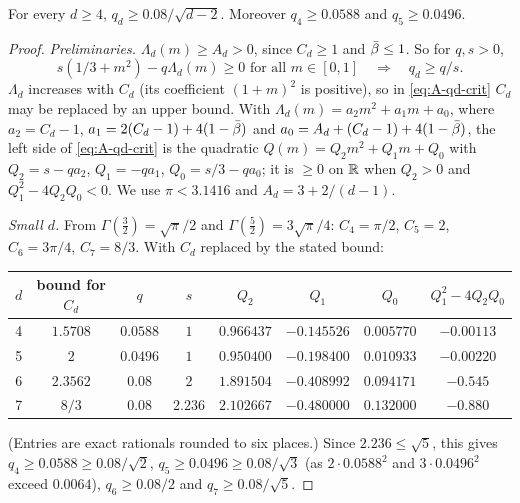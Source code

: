 \begin{proposition}\label{prop:A-qd}
For every $d \ge 4$, $q_d \ge 0.08/\sqrt{d-2}$. Moreover $q_4 \ge 0.0588$ and $q_5 \ge 0.0496$.
\end{proposition}

\begin{proof}
\emph{Preliminaries.} $\Lambda_d(m) \ge A_d > 0$, since $C_d \ge 1$ and $\bar\beta \le 1$. So for $q, s > 0$,
\begin{equation}\label{eq:A-qd-crit}
  s(1/3 + m^2) - q\Lambda_d(m) \ge 0 \text{ for all } m \in [0, 1]
  \quad\Longrightarrow\quad q_d \ge q/s.
\end{equation}
$\Lambda_d$ increases with $C_d$ (its coefficient $(1+m)^2$ is positive), so in
\eqref{eq:A-qd-crit} $C_d$ may be replaced by an upper bound. With
$\Lambda_d(m) = a_2 m^2 + a_1 m + a_0$, where $a_2 = C_d - 1$, $a_1 = 2(C_d - 1) + 4(1 - \bar\beta)$ and
$a_0 = A_d + (C_d - 1) + 4(1 - \bar\beta)$, the left side of \eqref{eq:A-qd-crit} is the quadratic
$Q(m) = Q_2m^2 + Q_1m + Q_0$ with $Q_2 = s - qa_2$, $Q_1 = -qa_1$, $Q_0 = s/3 - qa_0$; it is $\ge 0$ on
$\mathbb{R}$ when $Q_2 > 0$ and $Q_1^2 - 4Q_2Q_0 < 0$. We use $\pi < 3.1416$ and $A_d = 3 + 2/(d-1)$.

\emph{Small $d$.} From $\Gamma(\frac32) = \sqrt\pi/2$ and $\Gamma(\frac52) = 3\sqrt\pi/4$:
$C_4 = \pi/2$, $C_5 = 2$, $C_6 = 3\pi/4$, $C_7 = 8/3$. With $C_d$ replaced by the stated bound:
\begin{center}
\small
\begin{tabular}{cccccccc}
\toprule
$d$ & bound for $C_d$ & $q$ & $s$ & $Q_2$ & $Q_1$ & $Q_0$ & $Q_1^2 - 4Q_2Q_0$\\
\midrule
4 & $1.5708$ & $0.0588$ & $1$ & $0.966437$ & $-0.145526$ & $0.005770$ & $-0.00113$\\
5 & $2$ & $0.0496$ & $1$ & $0.950400$ & $-0.198400$ & $0.010933$ & $-0.00220$\\
6 & $2.3562$ & $0.08$ & $2$ & $1.891504$ & $-0.408992$ & $0.094171$ & $-0.545$\\
7 & $8/3$ & $0.08$ & $2.236$ & $2.102667$ & $-0.480000$ & $0.132000$ & $-0.880$\\
\bottomrule
\end{tabular}
\end{center}
(Entries are exact rationals rounded to six places.) Since $2.236 \le \sqrt5$, this gives $q_4 \ge 0.0588 \ge 0.08/\sqrt2$, $q_5 \ge 0.0496 \ge 0.08/\sqrt3$ (as
$2 \cdot 0.0588^2$ and $3 \cdot 0.0496^2$ exceed $0.0064$), $q_6 \ge 0.08/2$ and $q_7 \ge 0.08/\sqrt5$.


\end{proof}
